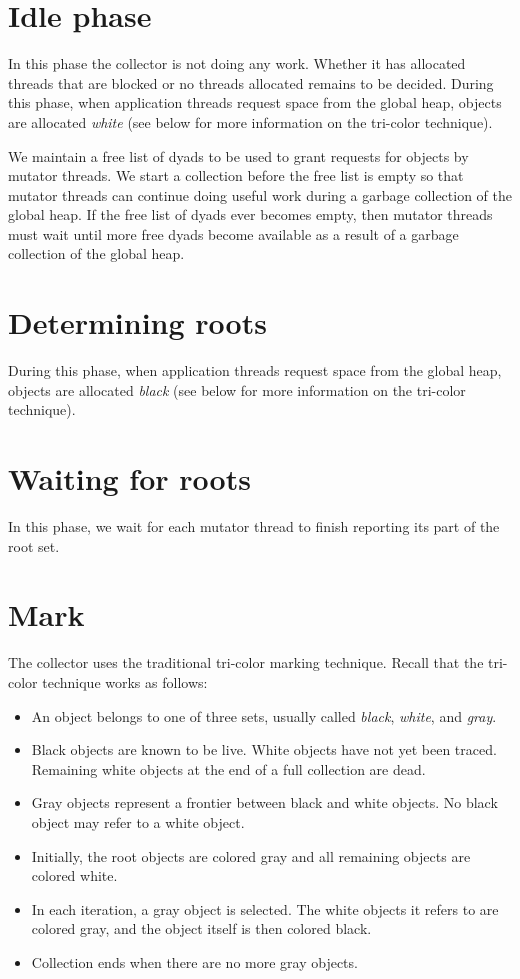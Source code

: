 \section{Idle phase}

In this phase the collector is not doing any work.  Whether it
has allocated threads that are blocked or no threads allocated
remains to be decided.  During this phase, when application threads
request space from the global heap, objects are allocated \emph{white}
(see below for more information on the tri-color technique).

We maintain a free list of dyads to be used to grant requests for
objects by mutator threads.  We start a collection before the free
list is empty so that mutator threads can continue doing useful work
during a garbage collection of the global heap.  If the free list of
dyads ever becomes empty, then mutator threads must wait until more
free dyads become available as a result of a garbage collection of the
global heap.

\section{Determining roots}

During this phase, when application
threads request space from the global heap, objects are allocated
\emph{black} (see below for more information on the tri-color
technique).

\section{Waiting for roots}

In this phase, we wait for each mutator thread to finish reporting its
part of the root set.

\section{Mark}

The collector uses the traditional tri-color marking
technique.  Recall that the tri-color technique works as follows:

\begin{itemize}
\item An object belongs to one of three sets, usually called
  \emph{black}, \emph{white}, and \emph{gray}.
\item Black objects are known to be live.  White objects have not yet
  been traced.  Remaining white objects at the end of a full
  collection are dead.
\item Gray objects represent a frontier between black and white
  objects.  No black object may refer to a white object.
\item Initially, the root objects are colored gray and all remaining
  objects are colored white.
\item In each iteration, a gray object is selected.  The white objects
  it refers to are colored gray, and the object itself is then colored
  black.
\item Collection ends when there are no more gray objects.
\end{itemize}

